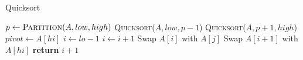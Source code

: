 \documentclass{article}
\begin{document}
\begin{algorithm}
\caption{Quicksort}
\begin{algorithmic}[1]
        \State $p \gets \textsc{Partition}(A, low, high)$
        \State \textsc{Quicksort}($A, low, p-1$)
        \State \textsc{Quicksort}($A, p+1, high$)
    \EndIf
\EndProcedure
{}
    \State $pivot \gets A[hi]$
    \State $i \gets lo - 1$
            \State $i \gets i + 1$
            \State Swap $A[i]$ with $A[j]$
        \EndIf
    \EndFor
    \State Swap $A[i+1]$ with $A[hi]$
    \State \textbf{return} $i+1$
\EndProcedure
\end{algorithmic}
\end{algorithm}
\end{document}
